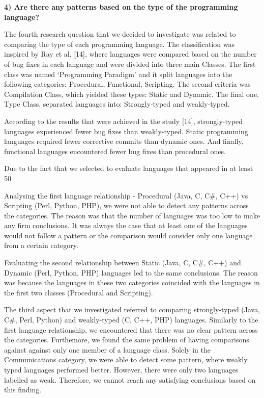\textbf{4) Are there any patterns based on the type of the programming language?}

The fourth research question that we decided to investigate was related to comparing the type of each programming language. The classification was inspired by Ray et al. [14], where languages were compared based on the number of bug fixes in each language and were divided into three main Classes. The first class was named ‘Programming Paradigm’ and it split languages into the following categories: Procedural, Functional, Scripting. The second criteria was Compilation Class, which yielded these types: Static and Dynamic. The final one, Type Class, separated languages into: Strongly-typed and weakly-typed.

According to the results that were achieved in the study [14], strongly-typed languages experienced fewer bug fixes than weakly-typed. Static programming languages required fewer corrective commits than dynamic ones. And finally, functional languages encountered fewer bug fixes than procedural ones.

Due to the fact that we selected to evaluate languages that appeared in at least 50%

Analysing the first language relationship - Procedural (Java, C, C\#, C++) vs Scripting (Perl, Python, PHP), we were not able to detect any patterns across the categories. The reason was that the number of languages was too low to make any firm conclusions. It was always the case that at least one of the languages would not follow a pattern or the comparison would consider only one language from a certain category.

Evaluating the second relationship between Static (Java, C, C\#, C++) and Dynamic (Perl, Python, PHP) languages led to the same conclusions. The reason was because the languages in these two categories coincided with the languages in the first two classes (Procedural and Scripting).

The third aspect that we investigated referred to comparing strongly-typed (Java, C\#, Perl, Python) and weakly-typed (C, C++, PHP) languages. Similarly to the first language relationship, we encountered that there was no clear pattern across the categories. Furthemore, we found the same problem of having comparisons against against only one member of a language class. Solely in the Communications category, we were able to detect some pattern, where weakly typed languages performed better. However, there were only two languages labelled as weak. Therefore, we cannot reach any satisfying conclusions based on this finding.


